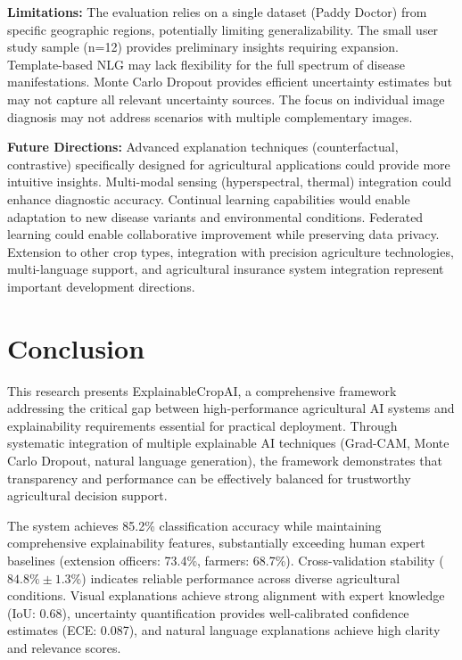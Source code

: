 \documentclass[agriculture,article,submit,pdftex,moreauthors]{Definitions/mdpi}
\begin{document}
\textbf{Limitations:} The evaluation relies on a single dataset (Paddy Doctor) from specific geographic regions, potentially limiting generalizability. The small user study sample (n=12) provides preliminary insights requiring expansion. Template-based NLG may lack flexibility for the full spectrum of disease manifestations. Monte Carlo Dropout provides efficient uncertainty estimates but may not capture all relevant uncertainty sources. The focus on individual image diagnosis may not address scenarios with multiple complementary images.

\textbf{Future Directions:} Advanced explanation techniques (counterfactual, contrastive) specifically designed for agricultural applications could provide more intuitive insights. Multi-modal sensing (hyperspectral, thermal) integration could enhance diagnostic accuracy. Continual learning capabilities would enable adaptation to new disease variants and environmental conditions. Federated learning could enable collaborative improvement while preserving data privacy. Extension to other crop types, integration with precision agriculture technologies, multi-language support, and agricultural insurance system integration represent important development directions.

\section{Conclusion}

This research presents ExplainableCropAI, a comprehensive framework addressing the critical gap between high-performance agricultural AI systems and explainability requirements essential for practical deployment. Through systematic integration of multiple explainable AI techniques (Grad-CAM, Monte Carlo Dropout, natural language generation), the framework demonstrates that transparency and performance can be effectively balanced for trustworthy agricultural decision support.

The system achieves 85.2\% classification accuracy while maintaining comprehensive explainability features, substantially exceeding human expert baselines (extension officers: 73.4\%, farmers: 68.7\%). Cross-validation stability ($84.8\% \pm 1.3\%$) indicates reliable performance across diverse agricultural conditions. Visual explanations achieve strong alignment with expert knowledge (IoU: 0.68), uncertainty quantification provides well-calibrated confidence estimates (ECE: 0.087), and natural language explanations achieve high clarity and relevance scores.
\end{document}
